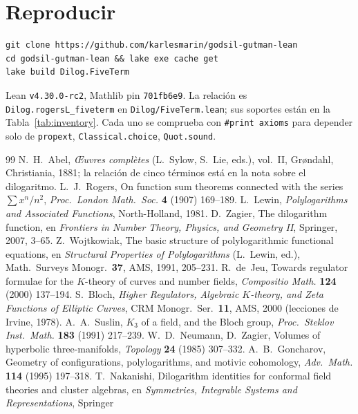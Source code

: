 \documentclass[11pt]{article}
\newcommand{\lean}[1]{\texttt{#1}}
\begin{document}
\section*{Reproducir}
\begin{verbatim}
git clone https://github.com/karlesmarin/godsil-gutman-lean
cd godsil-gutman-lean && lake exe cache get
lake build Dilog.FiveTerm
\end{verbatim}
Lean \lean{v4.30.0-rc2}, Mathlib pin \lean{701fb6e9}. La relaci\'on es
\lean{Dilog.rogersL\_fiveterm} en \lean{Dilog/FiveTerm.lean}; sus soportes est\'an en la
Tabla~\ref{tab:inventory}. Cada uno se comprueba con \lean{\#print axioms} para depender solo
de \lean{propext}, \lean{Classical.choice}, \lean{Quot.sound}.

\begin{thebibliography}{99}\small
{} N.~H.~Abel, \emph{\OE uvres compl\`etes} (L.~Sylow, S.~Lie, eds.), vol.~II,
Gr{\o}ndahl, Christiania, 1881; la relaci\'on de cinco t\'erminos est\'a en la nota sobre el
dilogaritmo.
 L.~J.~Rogers, On function sum theorems connected with the series
$\sum x^n/n^2$, \emph{Proc.\ London Math.\ Soc.} \textbf{4} (1907) 169--189.
 L.~Lewin, \emph{Polylogarithms and Associated Functions}, North-Holland,
1981.
 D.~Zagier, The dilogarithm function, en \emph{Frontiers in Number Theory,
Physics, and Geometry II}, Springer, 2007, 3--65.
 Z.~Wojtkowiak, The basic structure of polylogarithmic functional
equations, en \emph{Structural Properties of Polylogarithms} (L.~Lewin, ed.), Math.\
Surveys Monogr.\ \textbf{37}, AMS, 1991, 205--231.
 R.~de~Jeu, Towards regulator formulae for the $K$-theory of curves and
number fields, \emph{Compositio Math.} \textbf{124} (2000) 137--194.
\bibitem{bloch} S.~Bloch, \emph{Higher Regulators, Algebraic $K$-theory, and Zeta Functions
of Elliptic Curves}, CRM Monogr.\ Ser.\ \textbf{11}, AMS, 2000 (lecciones de Irvine, 1978).
\bibitem{suslin} A.~A.~Suslin, $K_3$ of a field, and the Bloch group, \emph{Proc.\ Steklov
Inst.\ Math.} \textbf{183} (1991) 217--239.
 W.~D.~Neumann, D.~Zagier, Volumes of hyperbolic three-manifolds,
\emph{Topology} \textbf{24} (1985) 307--332.
 A.~B.~Goncharov, Geometry of configurations, polylogarithms, and
motivic cohomology, \emph{Adv.\ Math.} \textbf{114} (1995) 197--318.
\bibitem{nakanishi} T.~Nakanishi, Dilogarithm identities for conformal field theories and
cluster algebras, en \emph{Symmetries, Integrable Systems and Representations}, Springer

\end{thebibliography}
\end{document}
